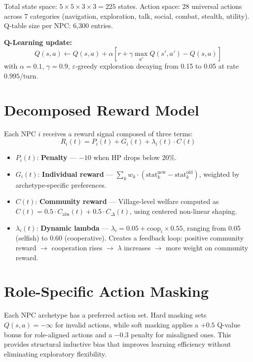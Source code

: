\documentclass[12pt, a4paper, oneside]{report}
\begin{document}
Total state space: $5 \times 5 \times 3 \times 3 = 225$ states. Action space: 28 universal actions across 7 categories (navigation, exploration, talk, social, combat, stealth, utility). Q-table size per NPC: 6,300 entries.

\textbf{Q-Learning update:}
\begin{equation}
    Q(s, a) \leftarrow Q(s, a) + \alpha \left[ r + \gamma \max_{a'} Q(s', a') - Q(s, a) \right]
\end{equation}
with $\alpha = 0.1$, $\gamma = 0.9$, $\varepsilon$-greedy exploration decaying from 0.15 to 0.05 at rate $0.995$/turn.

\section{Decomposed Reward Model}
\label{sec:reward-model}

Each NPC $i$ receives a reward signal composed of three terms:
\begin{equation}
    R_i(t) = P_i(t) + G_i(t) + \lambda_i(t) \cdot C(t)
    \label{eq:reward}
\end{equation}

\begin{itemize}[nosep]
    \item $P_i(t)$: \textbf{Penalty} --- $-10$ when HP drops below 20\%.
    \item $G_i(t)$: \textbf{Individual reward} --- $\sum_k w_k \cdot (\text{stat}_k^{\text{new}} - \text{stat}_k^{\text{old}})$, weighted by archetype-specific preferences.
    \item $C(t)$: \textbf{Community reward} --- Village-level welfare computed as $C(t) = 0.5 \cdot C_{\text{abs}}(t) + 0.5 \cdot C_{\Delta}(t)$, using centered non-linear shaping.
    \item $\lambda_i(t)$: \textbf{Dynamic lambda} --- $\lambda_i = 0.05 + \text{coop}_i \times 0.55$, ranging from 0.05 (selfish) to 0.60 (cooperative). Creates a feedback loop: positive community reward $\to$ cooperation rises $\to$ $\lambda$ increases $\to$ more weight on community reward.
\end{itemize}

\section{Role-Specific Action Masking}
\label{sec:action-masking}

Each NPC archetype has a preferred action set. Hard masking sets $Q(s,a) = -\infty$ for invalid actions, while soft masking applies a $+0.5$ Q-value bonus for role-aligned actions and a $-0.3$ penalty for misaligned ones. This provides structural inductive bias that improves learning efficiency without eliminating exploratory flexibility.
\end{document}
